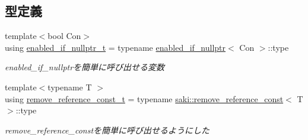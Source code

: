 \subsection*{型定義}
\begin{DoxyCompactItemize}
\item 
{\footnotesize template$<$bool Con$>$ }\\using \mbox{\hyperlink{namespacesaki_aa1258d80ed2c906b1e48aee518368d43}{enabled\+\_\+if\+\_\+nullptr\+\_\+t}} = typename \mbox{\hyperlink{structsaki_1_1enabled__if__nullptr}{enabled\+\_\+if\+\_\+nullptr}}$<$ Con $>$\+::type
\begin{DoxyCompactList}\small\item\em enabled\+\_\+if\+\_\+nullptrを簡単に呼び出せる変数 \end{DoxyCompactList}\item 
{\footnotesize template$<$typename T $>$ }\\using \mbox{\hyperlink{namespacesaki_aff6964622fdfcdf489dab4b87727a8e4}{remove\+\_\+reference\+\_\+const\+\_\+t}} = typename \mbox{\hyperlink{structsaki_1_1remove__reference__const}{saki\+::remove\+\_\+reference\+\_\+const}}$<$ T $>$\+::type
\begin{DoxyCompactList}\small\item\em remove\+\_\+reference\+\_\+constを簡単に呼び出せるようにした \end{DoxyCompactList}\end{DoxyCompactItemize}
